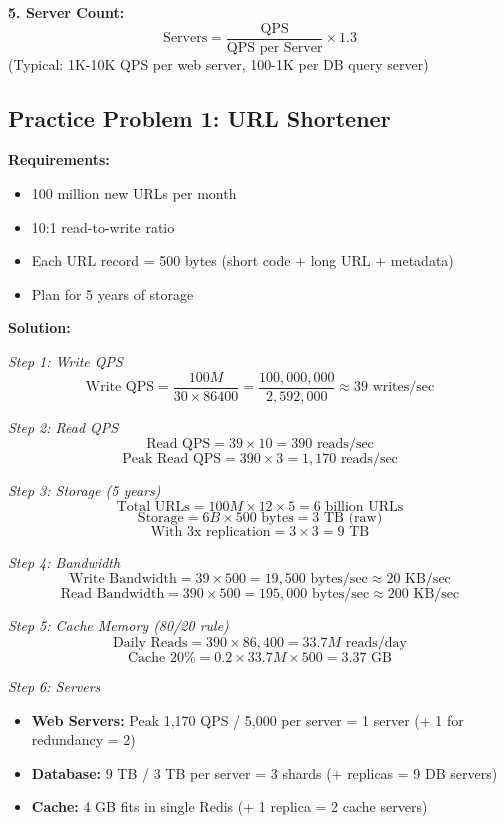 \documentclass[10pt]{article}
\begin{document}
\textbf{5. Server Count:}
\[
\text{Servers} = \frac{\text{QPS}}{\text{QPS per Server}} \times 1.3
\]
(Typical: 1K-10K QPS per web server, 100-1K per DB query server)

\subsection{Practice Problem 1: URL Shortener}

\textbf{Requirements:}
\begin{itemize}
\item 100 million new URLs per month
\item 10:1 read-to-write ratio
\item Each URL record = 500 bytes (short code + long URL + metadata)
\item Plan for 5 years of storage
\end{itemize}

\textbf{Solution:}

\textit{Step 1: Write QPS}
\[
\text{Write QPS} = \frac{100M}{30 \times 86400} = \frac{100,000,000}{2,592,000} \approx 39 \text{ writes/sec}
\]

\textit{Step 2: Read QPS}
\[
\text{Read QPS} = 39 \times 10 = 390 \text{ reads/sec}
\]
\[
\text{Peak Read QPS} = 390 \times 3 = 1,170 \text{ reads/sec}
\]

\textit{Step 3: Storage (5 years)}
\[
\text{Total URLs} = 100M \times 12 \times 5 = 6 \text{ billion URLs}
\]
\[
\text{Storage} = 6B \times 500 \text{ bytes} = 3 \text{ TB (raw)}
\]
\[
\text{With 3x replication} = 3 \times 3 = 9 \text{ TB}
\]

\textit{Step 4: Bandwidth}
\[
\text{Write Bandwidth} = 39 \times 500 = 19,500 \text{ bytes/sec} \approx 20 \text{ KB/sec}
\]
\[
\text{Read Bandwidth} = 390 \times 500 = 195,000 \text{ bytes/sec} \approx 200 \text{ KB/sec}
\]

\textit{Step 5: Cache Memory (80/20 rule)}
\[
\text{Daily Reads} = 390 \times 86,400 = 33.7M \text{ reads/day}
\]
\[
\text{Cache 20\%} = 0.2 \times 33.7M \times 500 = 3.37 \text{ GB}
\]

\textit{Step 6: Servers}
\begin{itemize}
\item \textbf{Web Servers:} Peak 1,170 QPS / 5,000 per server = 1 server (+ 1 for redundancy = 2)
\item \textbf{Database:} 9 TB / 3 TB per server = 3 shards (+ replicas = 9 DB servers)
\item \textbf{Cache:} 4 GB fits in single Redis (+ 1 replica = 2 cache servers)
\end{itemize}
\end{document}
